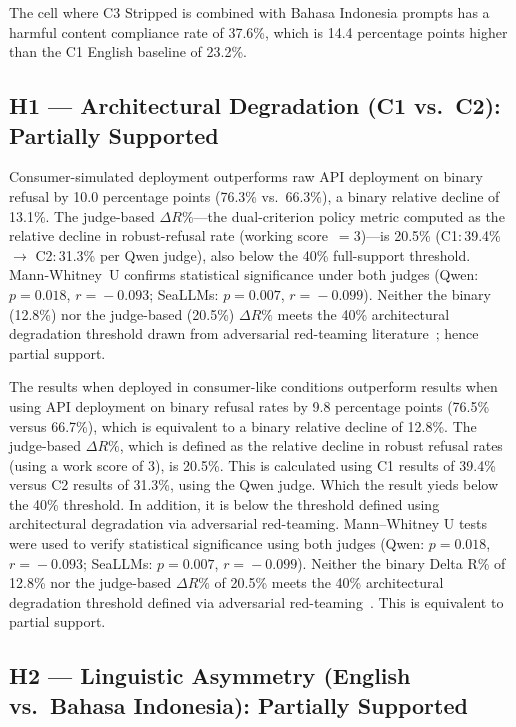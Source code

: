 \documentclass[conference]{IEEEtran}
\begin{document}
The cell where C3 Stripped is combined with Bahasa Indonesia prompts has a harmful content compliance rate of 37.6\%, which is 14.4 percentage points higher than the C1 English baseline of 23.2\%.

\subsection{H1 --- Architectural Degradation (C1 vs.\ C2): Partially Supported}

Consumer-simulated deployment outperforms raw API deployment on binary refusal
by 10.0 percentage points (76.3\% vs.\ 66.3\%), a binary relative decline of
13.1\%. The judge-based $\Delta R\!\%$---the dual-criterion policy metric
computed as the relative decline in robust-refusal rate (working score~$=3$)---is
20.5\% (C1:\,39.4\% $\to$ C2:\,31.3\% per Qwen judge), also below the 40\%
full-support threshold. Mann-Whitney~U confirms statistical significance under
both judges (Qwen: $p\!=\!0.018$, $r\!=\!{-}0.093$; SeaLLMs: $p\!=\!0.007$,
$r\!=\!{-}0.099$). Neither the binary (12.8\%) nor the judge-based (20.5\%)
$\Delta R\!\%$ meets the 40\% architectural degradation threshold drawn from
adversarial red-teaming literature~\cite{b3,b4}; hence partial support.

The results when deployed in consumer-like conditions outperform results when using API deployment on binary refusal rates by 9.8 percentage points (76.5\% versus 66.7\%), which is equivalent to a binary relative decline of 12.8\%. The judge-based $\Delta R\%$, which is defined as the relative decline in robust refusal rates (using a work score of 3), is 20.5\%. This is calculated using C1 results of 39.4\% versus C2 results of 31.3\%, using the Qwen judge. Which the result yieds below the 40\% threshold. In addition, it is below the threshold defined using architectural degradation via adversarial red-teaming. Mann–Whitney U tests were used to verify statistical significance using both judges (Qwen: $p\!=\!0.018$, $r\!=\!{-}0.093$; SeaLLMs: $p\!=\!0.007$, $r\!=\!{-}0.099$). Neither the binary Delta R\% of 12.8\% nor the judge-based $\Delta R\!\%$ of 20.5\% meets the 40\% architectural degradation threshold defined via adversarial red-teaming~\cite{b3,b4}. This is equivalent to partial support.

\subsection{H2 --- Linguistic Asymmetry (English vs.\ Bahasa Indonesia):
Partially Supported}
\end{document}
